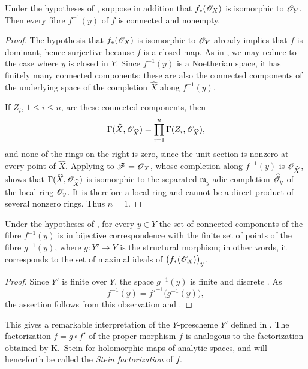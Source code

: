 \begin{corollary}[4.3.2]
\label{III.4.3.2}
Under the hypotheses of , suppose in addition that
$f_*(\mathscr{O}_X)$ is isomorphic to $\mathscr{O}_Y$.  Then every fibre
$f^{-1}(y)$ of $f$ is connected and nonempty.
\end{corollary}

\begin{proof}
The hypothesis that $f_*(\mathscr{O}_X)$ is isomorphic to $\mathscr{O}_Y$
already implies that $f$ is dominant, hence surjective because $f$
is a closed map.  As in , we may reduce to the case
where $y$ is closed in $Y$.  Since $f^{-1}(y)$ is a Noetherian
space, it has finitely many connected components; these are also the
connected components of the underlying space of the completion
$\widehat{X}$ along $f^{-1}(y)$.

If $Z_i$, $1\leq i\leq n$, are these connected components, then
\[
  \Gamma(\widehat{X},\mathscr{O}_{\widehat{X}})
  =
  \prod_{i=1}^{n}\Gamma(Z_i,\mathscr{O}_{\widehat{X}}),
\]
and none of the rings on the right is zero, since the unit section is
nonzero at every point of $\widehat{X}$.  Applying
 to $\mathscr{F}=\mathscr{O}_X$, whose completion along
$f^{-1}(y)$ is $\mathscr{O}_{\widehat{X}}$, shows that
$\Gamma(\widehat{X},\mathscr{O}_{\widehat{X}})$ is isomorphic to the
separated $\mathfrak{m}_y$-adic completion
$\widehat{\mathscr{O}}_y$ of the local ring $\mathscr{O}_y$.  It is therefore
a local ring and cannot be a direct product of several nonzero rings.
Thus $n=1$.
\end{proof}

\begin{corollary}[4.3.3]
\label{III.4.3.3}
Under the hypotheses of , for every $y\in Y$ the set
of connected components of the fibre $f^{-1}(y)$ is in bijective
correspondence with the finite set of points of the fibre
$g^{-1}(y)$, where $g:Y'\to Y$ is the structural morphism; in other
words, it corresponds to the set of maximal ideals of
$\bigl(f_*(\mathscr{O}_X)\bigr)_y$.
\end{corollary}

\begin{proof}
Since $Y'$ is finite over $Y$, the space $g^{-1}(y)$ is finite and
discrete .  As
\[
  f^{-1}(y)=f'^{-1}\bigl(g^{-1}(y)\bigr),
\]
the assertion follows from this observation and
.
\end{proof}

This gives a remarkable interpretation of the $Y$-prescheme $Y'$
defined in .  The factorization
$f=g\circ f'$ of the proper morphism $f$ is analogous to the
factorization obtained by K.~Stein for holomorphic maps of analytic
spaces, and will henceforth be called the \emph{Stein factorization}
of $f$.

